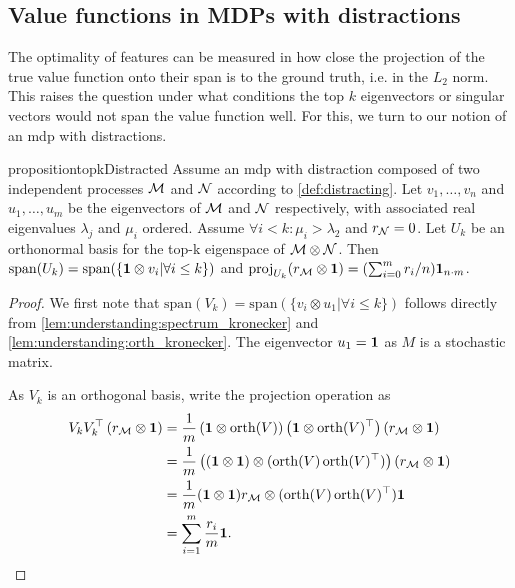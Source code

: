 \subsection{Value functions in MDPs with distractions}
\label{app:distraction_motivation}

The optimality of features can be measured in how close the projection of the true value function onto their span is to the ground truth, i.e. in the $L_2$ norm.
This raises the question under what conditions the top $k$ eigenvectors or singular vectors would not span the value function well.
For this, we turn to our notion of an \ac{mdp} with distractions.

\begin{restatable}{proposition}{topkDistracted} \label{prop:SubptimalTopKProduct} Assume an \ac{mdp}  with distraction composed of two independent processes ${\mathcal{M}}$ and ${\mathcal{N}}$ according to \cref{def:distracting}.
Let $v_1,\dots,v_n$ and $u_1,\dots,u_m$ be the eigenvectors of ${\mathcal{M}}$ and ${\mathcal{N}}$ respectively, with associated real eigenvalues $\lambda_j$ and $\mu_i$ ordered.
Assume $\forall i < k: \mu_i > \lambda_2$ and $r_{\mathcal{N}} = 0$.
Let $U_k$ be an orthonormal basis for the top-k eigenspace of ${\mathcal{M}} \otimes {\mathcal{N}}$.
Then $\mathrm{span}(U_k) = \mathrm{span}(\{{\bm{1}} \otimes v_i|\forall i \leq k\})$ and $\mathrm{proj}_{U_k}(r_{\mathcal{M}} \otimes {\bm{1}}) = (\sum_{i=0}^m r_i / n) {\bm{1}}_{n\cdot m}$.
\end{restatable}
\begin{proof}
We first note that $\mathrm{span}(V_k) = \mathrm{span}(\{v_i\otimes u_1|\forall i \leq k\})$ follows directly from \autoref{lem:understanding:spectrum_kronecker} and \autoref{lem:understanding:orth_kronecker}. The eigenvector $u_1 = {\bm{1}}$ as $M$ is a stochastic matrix.

As $V_k$ is an orthogonal basis, write the projection operation as 
\begin{align}
V_k V_k^\top \left(r_{\mathcal{M}} \otimes {\bm{1}}\right) &= \frac{1}{m}\left({\bm{1}} \otimes \mathrm{orth}(V)\right)\left({\bm{1}} \otimes \mathrm{orth}(V)^\top \right)\left(r_{\mathcal{M}} \otimes {\bm{1}}\right) \\
&= \frac{1}{m}\left(({\bm{1}} \otimes {\bm{1}}) \otimes (\mathrm{orth}(V)\,\mathrm{orth}(V)^\top)\right) (r_{\mathcal{M}} \otimes {\bm{1}})\\
&= \frac{1}{m}({\bm{1}} \otimes {\bm{1}}) r_{\mathcal{M}} \otimes (\mathrm{orth}(V)\,\mathrm{orth}(V)^\top) {\bm{1}} \\
&= \sum_{i=1}^m \frac{r_i}{m}{\bm{1}}.
\end{align}

\end{proof}


